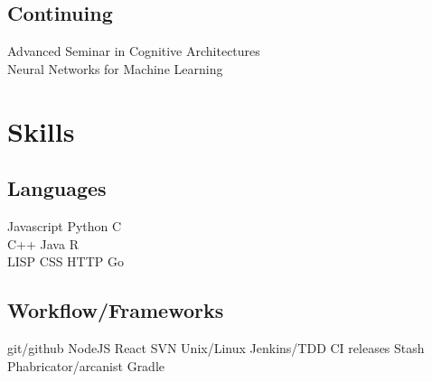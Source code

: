 \documentclass[]{csaund_resume-openfont}
\begin{document}
\begin{minipage}[t]{0.30\textwidth}
\subsection{Continuing}
Advanced Seminar in Cognitive Architectures \\
Neural Networks for Machine Learning 


\section{Skills}
\subsection{Languages}
Javascript \textbullet{} Python \textbullet{} C \\
C++ \textbullet{} Java \textbullet{} R   \\
LISP \textbullet{} CSS \textbullet{} HTTP \textbullet{} Go \\
\vspace{\topsep} %

\subsection{Workflow/Frameworks}
git/github \textbullet{} NodeJS  \textbullet{} React \textbullet{} SVN \textbullet{}  Unix/Linux \textbullet{} Jenkins/TDD \textbullet{} CI releases \textbullet{}
 Stash \textbullet{} Phabricator/arcanist \textbullet{} Gradle
\sectionsep

%
%

\end{minipage}
\hfill
\end{document}
